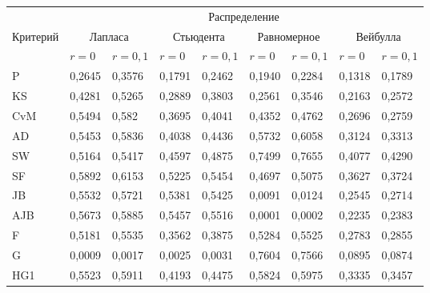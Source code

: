 \begin{multicols}{2}
\begin{table*}[b]\small %
\vspace*{-3pt}
\begin{center}
\parbox{370pt}{
}

\vspace*{2ex}

\begin{tabular}{|l|l|l|l|l|l|l|l|l|}
\hline
 & \multicolumn{8}{c|}{Распределение}\\
\cline{2-9}
\multicolumn{1}{|c|}{Критерий}&\multicolumn{2}{c|}{Лапласа}&\multicolumn{2}{c|}{Стьюдента}&\multicolumn{2}{c|}{Равномерное}&\multicolumn{2}{c|}{Вейбулла}\\
\cline{2-9}
&$r=0$&$r=0{,}1$&$r=0$&$r=0{,}1$&$r=0$&$r=0{,}1$&$r=0$&$r=0{,}1$\\
\hline
\hspace*{4mm}P&0,2645&0,3576&0,1791&0,2462&0,1940&0,2284&0,1318&0,1789\\
\hspace*{4mm}KS&0,4281&0,5265&0,2889&0,3803&0,2561&0,3546&0,2163&0,2572\\
\hspace*{4mm}CvM&0,5494&0,582&0,3695&0,4041&0,4352&0,4762&0,2696&0,2759\\
\hspace*{4mm}AD&0,5453&0,5836&0,4038&0,4436&0,5732&0,6058&0,3124&0,3313\\
\hspace*{4mm}SW&0,5164&0,5417&0,4597&0,4875&0,7499&0,7655&0,4077&0,4290\\
\hspace*{4mm}SF&0,5892&0,6153&0,5225&0,5454&0,4697&0,5075&0,3627&0,3724\\
\hspace*{4mm}JB&0,5532&0,5721&0,5381&0,5425&0,0091&0,0124&0,2545&0,2714\\
\hspace*{4mm}AJB&0,5673&0,5885&0,5457&0,5516&0,0001&0,0002&0,2235&0,2383\\
\hspace*{4mm}F&0,5181&0,5535&0,3562&0,3875&0,5284&0,5525&0,2783&0,2855\\
\hspace*{4mm}G&0,0009&0,0017&0,0025&0,0031&0,7604&0,7566&0,0895&0,0874\\
\hspace*{4mm}HG1&0,5523&0,5911&0,4193&0,4475&0,5824&0,5975&0,3335&0,3457\\

\end{tabular}
\end{center}
\end{table*}
\end{multicols}
